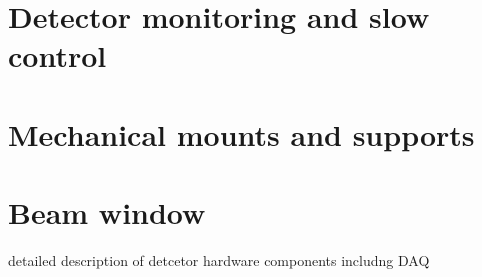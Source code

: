 \section{Detector monitoring and slow control}

\section{Mechanical mounts and supports}

\section{Beam window}

detailed description of detcetor hardware components includng DAQ

